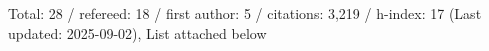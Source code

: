 Total: 28 / refereed: 18 / first author: 5 / citations: 3,219 / h-index: 17 (Last updated: 2025-09-02), List attached below